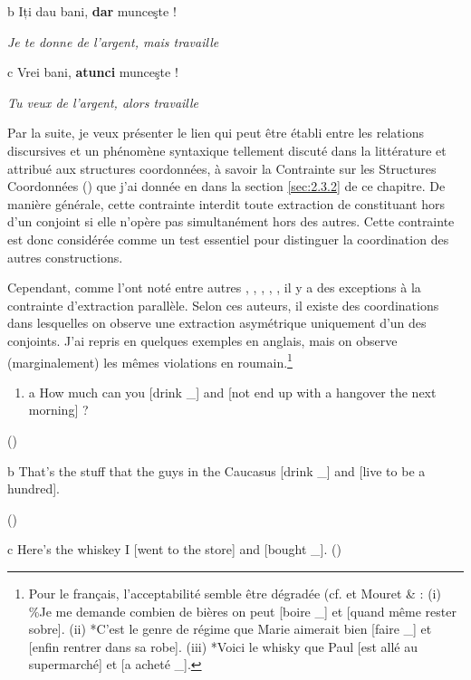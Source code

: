   b  Iți dau bani, \textbf{dar} munceşte !

{\itshape
Je te donne de l'argent, mais travaille}

 c  Vrei bani, \textbf{atunci} munceşte !  

    \textit{Tu veux de l'argent, alors travaille}

Par la suite, je veux présenter le lien qui peut être établi entre les relations discursives et un phénomène syntaxique tellement discuté dans la littérature et attribué aux structures coordonnées, à savoir la Contrainte sur les Structures Coordonnées (\citet{Ross1967}) que j'ai donnée en  dans la section \ref{sec:2.3.2} de ce chapitre. De manière générale, cette contrainte interdit toute extraction de constituant hors d'un conjoint si elle n'opère pas simultanément hors des autres. Cette contrainte est donc considérée comme un test essentiel pour distinguer la coordination des autres constructions.  

Cependant, comme l'ont noté entre autres \citet{Ross1967}, \citet{Schmerling1972}, \citet{Goldsmith1985}, \citet{Lakoff1986}, \citet{Kehler2002}, il y a des exceptions à la contrainte d'extraction parallèle. Selon ces auteurs, il existe des coordinations dans lesquelles on observe une extraction asymétrique uniquement d'un des conjoints. J'ai repris en  quelques exemples en anglais, mais on observe (marginalement) les mêmes violations en roumain.\footnote{Pour le français, l'acceptabilité semble être dégradée (cf. \citet{Mouret2007} et Mouret \& \citet{Desmets2008} :
(i)   \%Je me demande combien de bières on peut [boire \_] et [quand même rester sobre].
(ii)  *C'est le genre de régime que Marie aimerait bien [faire \_] et [enfin rentrer dans sa robe]. 
(iii)  *Voici le whisky que Paul [est allé au supermarché] et [a acheté \_].  } 


\begin{enumerate}
\item \label{bkm:Ref272881233}a  How much can you [drink \_] and [not end up with a hangover the next morning] ?


\end{enumerate}
{\raggedleft
 (\citet[135]{Goldsmith1985})
}

  b  That's the stuff that the guys in the Caucasus [drink \_] and [live to be a hundred].

{\raggedleft
 (\citet[156]{Lakoff1986}) 
}

  c  Here's the whiskey I [went to the store] and [bought \_].       (\citet[94]{Ross1967})

